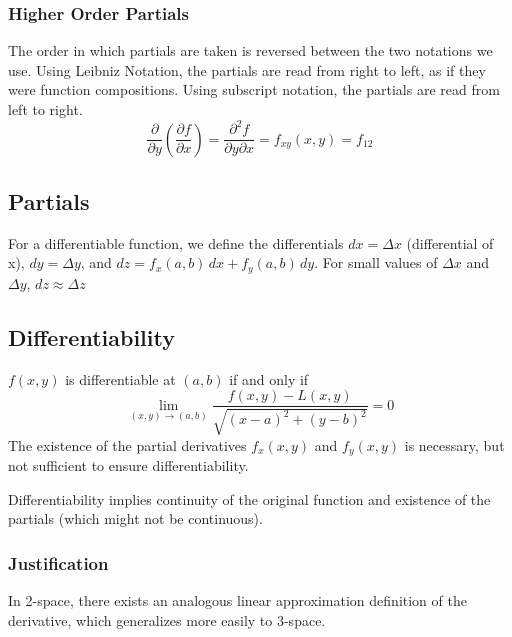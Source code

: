 \documentclass{article}
\begin{document}
\subsubsection{Higher Order Partials}
The order in which partials are taken is reversed between the two notations we use. Using Leibniz Notation, the partials are read from right to left, as if they were function compositions. Using subscript notation, the partials are read from left to right.
\[
    \frac{\partial}{\partial y} \left(\frac{\partial f}{\partial x}\right) = \frac{\partial^2f}{\partial y \partial x} = f_{xy}(x,y) = f_{12}
\]

\subsection{Partials}
For a differentiable function, we define the differentials $dx=\Delta x$ (differential of x), $dy=\Delta y$, and $dz = f_x(a,b)\,dx + f_y(a,b)\,dy$. For small values of $\Delta x$ and $\Delta y$, $dz\approx\Delta z$

\subsection{Differentiability}
$f(x,y)$ is differentiable at $(a,b)$ if and only if
\[
	\lim_{(x,y)\to(a,b)} \frac{f(x,y) - L(x,y)}{\sqrt{(x-a)^2 + (y-b)^2}} = 0
\]
The existence of the partial derivatives $f_x(x,y)$ and $f_y(x,y)$ is necessary, but not sufficient to ensure differentiability.

Differentiability implies continuity of the original function and existence of the partials (which might not be continuous).

\subsubsection{Justification}
In 2-space, there exists an analogous linear approximation definition of the derivative, which generalizes more easily to 3-space.
\end{document}
